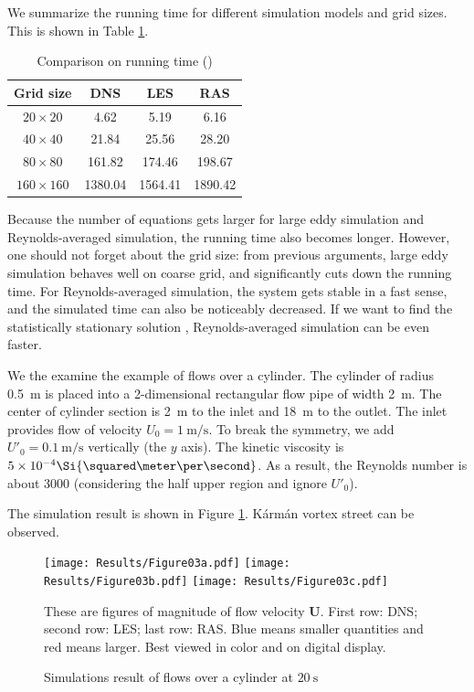 \documentclass[english, nochinese]{pkupaper}
\begin{document}
We summarize the running time for different simulation models and grid sizes. This is shown in Table \ref{Tbl:Run}.

\begin{table}[htbp]
\centering
\caption{Comparison on running time (\Si{\second})}
\label{Tbl:Run}
\begin{tabular}{|c|c|c|c|}
\hline
Grid size & DNS & LES & RAS \\
\hline
$ 20 \times 20 $ & 4.62 & 5.19 & 6.16 \\
\hline
$ 40 \times 40 $ & 21.84 & 25.56 & 28.20 \\
\hline
$ 80 \times 80 $ & 161.82 & 174.46 & 198.67 \\
\hline
$ 160 \times 160 $ & 1380.04 & 1564.41 & 1890.42 \\
\hline
\end{tabular}
\end{table}

Because the number of equations gets larger for large eddy simulation and Reynolds-averaged simulation, the running time also becomes longer. However, one should not forget about the grid size: from previous arguments, large eddy simulation behaves well on coarse grid, and significantly cuts down the running time. For Reynolds-averaged simulation, the system gets stable in a fast sense, and the simulated time can also be noticeably decreased. If we want to find the statistically stationary solution , Reynolds-averaged simulation can be even faster.

We the examine the example of flows over a cylinder. The cylinder of radius \SI{0.5}{\meter} is placed into a 2-dimensional rectangular flow pipe of width \SI{2}{\meter}. The center of cylinder section is \SI{2}{\meter} to the inlet and \SI{18}{\meter} to the outlet. The inlet provides flow of velocity $ U_0 = \SI{1}{\meter\per\second} $. To break the symmetry, we add $ U'_0 = \SI{0.1}{\meter\per\second} $ vertically (the $y$ axis). The kinetic viscosity is $ 5 \times 10^{-4} \Si{\squared\meter\per\second} $. As a result, the Reynolds number is about 3000 (considering the half upper region and ignore $U'_0$).

The simulation result is shown in Figure \ref{Fig:Cyl}. K\'arm\'an vortex street can be observed.

\begin{figure}[htbp]
{
\centering
{
\texttt{[image: Results/Figure03a.pdf]}
\texttt{[image: Results/Figure03b.pdf]}
\texttt{[image: Results/Figure03c.pdf]}
}
\caption{Simulations result of flows over a cylinder at $\SI{20}{\second}$}
\label{Fig:Cyl}
}
{
\footnotesize
These are figures of magnitude of flow velocity $\mathbf{U}$. First row: DNS; second row: LES; last row: RAS. Blue means smaller quantities and red means larger. Best viewed in color and on digital display.
}
\end{figure}
\end{document}
